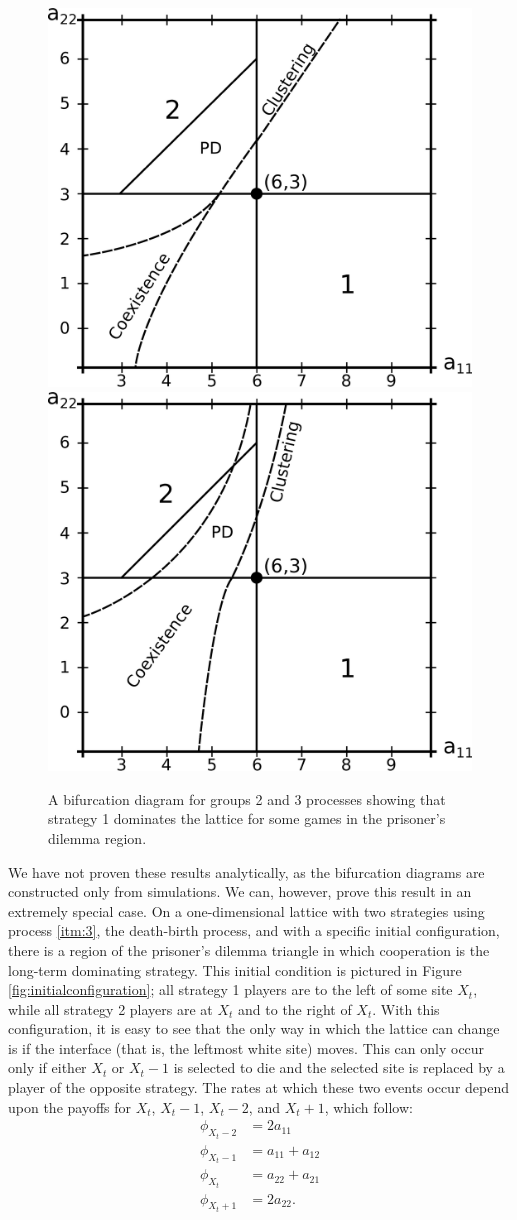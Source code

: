 \documentclass[notitlepage,reqno]{amsart}
\begin{document}
\begin{figure}[h]
\includegraphics[width=.5\textwidth]{./images/group_2_bifurcation_diagram_w_PD.eps}\includegraphics[width=.5\textwidth]{./images/group_3_bifurcation_diagram_w_PD.eps}
\caption{A bifurcation diagram for groups 2 and 3 processes showing
  that strategy 1 dominates the lattice for some games in the
  prisoner's dilemma region.}
\label{fig:groups2and3withpd}
\end{figure}

We have not proven these results analytically, as the bifurcation
diagrams are constructed only from simulations. We can, however, prove
this result in an extremely special case. On a one-dimensional lattice
with two strategies using process \ref{itm:3}, the death-birth process,
and with a specific initial configuration, there is a region of the
prisoner's dilemma triangle in which cooperation is the long-term
dominating strategy. This initial condition is pictured in Figure
\ref{fig:initialconfiguration}; all strategy 1 players are to the left
of some site $X_t$, while all strategy 2 players are at $X_t$ and to
the right of $X_t$. With this configuration, it is easy to see that
the only way in which the lattice can change is if the interface (that
is, the leftmost white site) moves. This can only occur only if either $X_t$ or
$X_t-1$ is selected to die and the selected site is replaced by a
player of the opposite strategy. The rates at which these two events occur
depend upon the payoffs for $X_t$, $X_t-1$, $X_t-2$, and $X_t+1$,
which follow:
\begin{align*}
  \phi_{X_t-2} &= 2a_{11} \\
  \phi_{X_t-1} &= a_{11} + a_{12} \\
  \phi_{X_t} &= a_{22} + a_{21} \\
  \phi_{X_t+1} &= 2a_{22}.
\end{align*}
\end{document}
